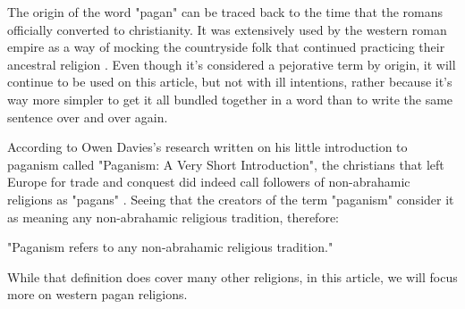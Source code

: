 The origin of the word "pagan" can be traced back to the time that the romans officially converted to
christianity. It was extensively used by the western roman empire as a way of mocking the countryside
folk that continued practicing their ancestral religion \cite{Bowersock1999}. Even though it's considered
a pejorative term by origin, it will continue to be used on this article, but not with ill
intentions, rather because it's way more simpler to get it all bundled together in a word than to
write the same sentence over and over again.

According to Owen Davies's research written on his little introduction to paganism called "Paganism:
A Very Short Introduction", the christians that left Europe for trade and conquest did indeed call
followers of non-abrahamic religions as "pagans" \cite{Davies2011}. Seeing that the creators of the term
"paganism" consider it as meaning any non-abrahamic religious tradition, therefore:

\begin{center}
    \itshape
    \parbox{0.7\textwidth}{
    "Paganism refers to any non-abrahamic religious tradition."
    }
\end{center}

While that definition does cover many other religions, in this article, we will focus more on western
pagan religions.